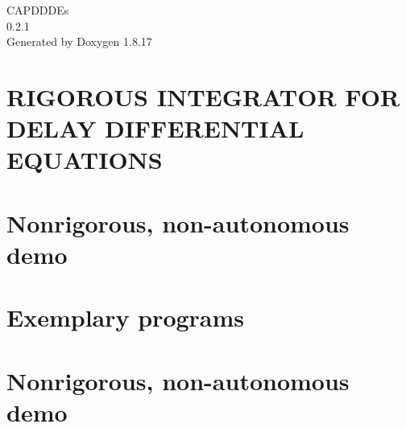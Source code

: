 \let\mypdfximage\pdfximage\def\pdfximage{\immediate\mypdfximage}\documentclass[twoside]{book}
\newcommand{\+}{\discretionary{\mbox{\scriptsize$\hookleftarrow$}}{}{}}
\newcommand{\clearemptydoublepage}{%
  \newpage{\pagestyle{empty}\cleardoublepage}%
}
\begin{document}
\hypersetup{pageanchor=false,
             bookmarksnumbered=true,
             pdfencoding=unicode
            }
\begin{titlepage}
\vspace*{7cm}
\begin{center}%
{\Large C\+A\+P\+D\+D\+D\+Es \\[1ex]\large 0.\+2.\+1 }\\
\vspace*{1cm}
{\large Generated by Doxygen 1.8.17}\\
\end{center}
\end{titlepage}
\clearemptydoublepage
{}
\tableofcontents
\clearemptydoublepage
{}
\hypersetup{pageanchor=true}

\chapter{R\+I\+G\+O\+R\+O\+US I\+N\+T\+E\+G\+R\+A\+T\+OR F\+OR D\+E\+L\+AY D\+I\+F\+F\+E\+R\+E\+N\+T\+I\+AL E\+Q\+U\+A\+T\+I\+O\+NS}
\label{index}\hypertarget{index}{}
\chapter{Nonrigorous, non-\/autonomous demo}
\label{md__home_robson_ROBERT-PRACA-CHMURA_eclipse-workspace_capdDDEs5_81_82_programs_examples_demo-elninio_README}

\chapter{Exemplary programs}
\label{md__home_robson_ROBERT-PRACA-CHMURA_eclipse-workspace_capdDDEs5_81_82_programs_examples_README}

\chapter{Nonrigorous, non-\/autonomous demo}
\label{md__home_robson_ROBERT-PRACA-CHMURA_eclipse-workspace_capdDDEs5_81_82_programs_examples_rossler-ode-vs-dde-code_README}

\end{document}
